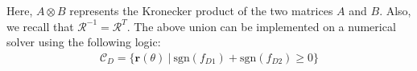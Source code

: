 Here, $A\otimes B$ represents the Kronecker product of the two matrices $A$ and $B$.
Also, we recall that ${\mathcal{R}}^{-1}={\mathcal{R}}^T$.
The above union can be implemented on a numerical solver using the following logic:
\begin{align}
    {\mathcal{C}}_D=\{\boldsymbol{r}(\theta)\ |\ \text{sgn}(f_{D1})+\text{sgn}(f_{D2})\geq0\}
\end{align}
